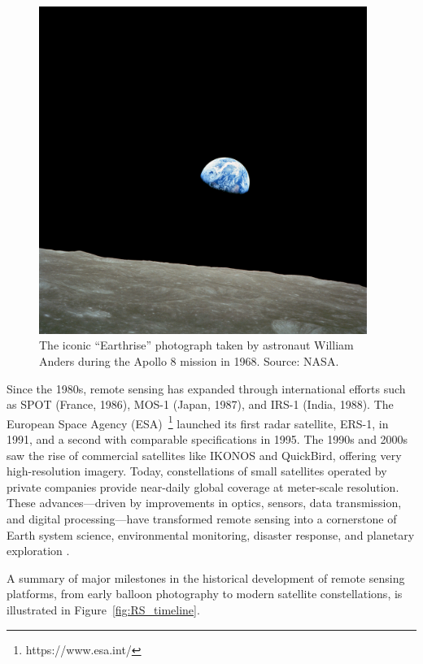 \begin{figure}[h!]
  \centering
  \includegraphics[width=0.95\textwidth]{img/earthrise.jpg}
  \caption[“Earthrise” photograph (Apollo 8, 1968)]{The iconic “Earthrise” photograph taken by astronaut William Anders during the Apollo 8 mission in 1968. Source: NASA.}
  \label{fig:earthrise}
\end{figure}

Since the 1980s, remote sensing has expanded through international efforts such as SPOT (France, 1986), MOS-1 (Japan, 1987), and IRS-1 (India, 1988). The European Space Agency (ESA)~\footnote{https://www.esa.int/} launched its first radar satellite, ERS-1, in 1991, and a second with comparable specifications in 1995. The 1990s and 2000s saw the rise of commercial satellites like IKONOS and QuickBird, offering very high-resolution imagery. Today, constellations of small satellites operated by private companies provide near-daily global coverage at meter-scale resolution. These advances—driven by improvements in optics, sensors, data transmission, and digital processing—have transformed remote sensing into a cornerstone of Earth system science, environmental monitoring, disaster response, and planetary exploration \cite{book_Satellite_RS}.

A summary of major milestones in the historical development of remote sensing platforms, from early balloon photography to modern satellite constellations, is illustrated in Figure~\ref{fig:RS_timeline}.

